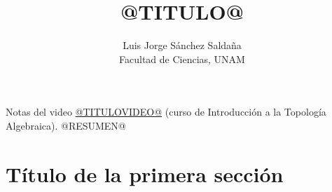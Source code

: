 \documentclass[11pt]{article}
\title{@TITULO@}
\author{Luis Jorge Sánchez Saldaña\\[2pt]\small Facultad de Ciencias, UNAM}
\date{}
\begin{document}
\maketitle

\noindent\small Notas del video
\href{https://www.youtube.com/watch?v=@VIDEOID@}{\guillemotleft{}@TITULOVIDEO@\guillemotright{}}
(curso de Introducción a la Topología Algebraica). @RESUMEN@
\normalsize

\section*{Título de la primera sección}

\end{document}
